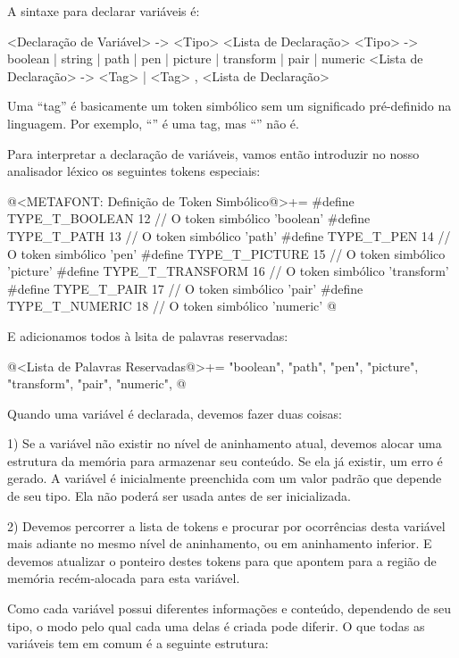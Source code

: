 
A sintaxe para declarar variáveis é:

\alinhaverbatim
<Declaração de Variável> -> <Tipo> <Lista de Declaração>
<Tipo> -> boolean | string | path | pen | picture | transform | pair |
          numeric
<Lista de Declaração> -> <Tag> | <Tag> , <Lista de Declaração>
\alinhanormal

Uma ``tag'' é basicamente um token simbólico sem um significado
pré-definido na linguagem. Por exemplo, ``'' é uma tag,
mas ``'' não é.

Para interpretar a declaração de variáveis, vamos então introduzir no
nosso analisador léxico os seguintes tokens especiais:

\iniciocodigo
@<METAFONT: Definição de Token Simbólico@>+=
#define TYPE_T_BOOLEAN               12 // O token simbólico 'boolean'
#define TYPE_T_PATH                  13 // O token simbólico 'path'
#define TYPE_T_PEN                   14 // O token simbólico 'pen'
#define TYPE_T_PICTURE               15 // O token simbólico 'picture'
#define TYPE_T_TRANSFORM             16 // O token simbólico 'transform'
#define TYPE_T_PAIR                  17 // O token simbólico 'pair'
#define TYPE_T_NUMERIC               18 // O token simbólico 'numeric'
@
\fimcodigo

E adicionamos todos à lsita de palavras reservadas:

\iniciocodigo
@<Lista de Palavras Reservadas@>+=
"boolean", "path", "pen", "picture", "transform", "pair", "numeric",
@
\fimcodigo


Quando uma variável é declarada, devemos fazer duas coisas:

1) Se a variável não existir no nível de aninhamento atual, devemos
alocar uma estrutura da memória para armazenar seu conteúdo. Se ela já
existir, um erro é gerado. A variável é inicialmente preenchida com um
valor padrão que depende de seu tipo. Ela não poderá ser usada antes
de ser inicializada.

2) Devemos percorrer a lista de tokens e procurar por ocorrências
desta variável mais adiante no mesmo nível de aninhamento, ou em
aninhamento inferior. E devemos atualizar o ponteiro destes tokens
para que apontem para a região de memória recém-alocada para esta
variável.

Como cada variável possui diferentes informações e conteúdo,
dependendo de seu tipo, o modo pelo qual cada uma delas é criada pode
diferir. O que todas as variáveis tem em comum é a seguinte estrutura:

